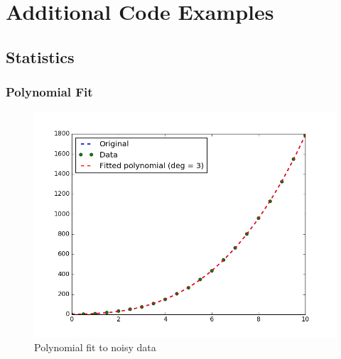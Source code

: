\chapter{Additional Code Examples} \label{App:AppendixA}
\section{Statistics}
\subsection{Polynomial Fit}
\begin{figure}[h!]
	\centering
	\includegraphics[width=\linewidth]{images/poly_fit.png}
    \caption{Polynomial fit to noisy data}
\end{figure}
\newpage
